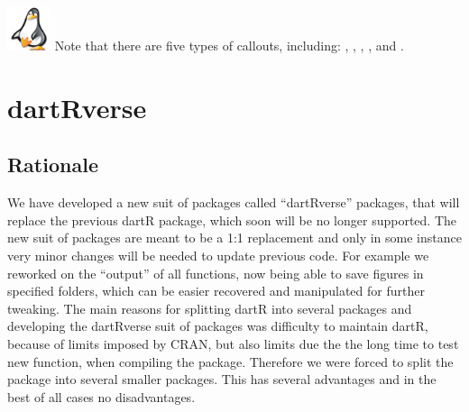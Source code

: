 \documentclass[
  letterpaper,
  DIV=11,
  numbers=noendperiod]{scrreprt}
\let\textttOrig\texttt
\renewcommand{\texttt}[1]{\textttOrig{\color{blue}{#1}}}
\begin{document}
\begin{tcolorbox}[enhanced jigsaw, coltitle=black, colframe=quarto-callout-note-color-frame, colbacktitle=quarto-callout-note-color!10!white, breakable, bottomtitle=1mm, rightrule=.15mm, opacitybacktitle=0.6, left=2mm, arc=.35mm, opacityback=0, leftrule=.75mm, toptitle=1mm, titlerule=0mm, title=\textcolor{quarto-callout-note-color}{\faInfo}\hspace{0.5em}{Exercise}, bottomrule=.15mm, toprule=.15mm, colback=white]

\includegraphics[width=0.5in,height=0.5in]{images/task.png} Note that
there are five types of callouts, including: \texttt{note},
\texttt{warning}, \texttt{important}, \texttt{tip}, and
\texttt{caution}.

\end{tcolorbox}


\hypertarget{dartrverse}{%
\chapter*{dartRverse}\label{dartrverse}}


\hypertarget{rationale}{%
\section*{Rationale}\label{rationale}}


We have developed a new suit of packages called ``dartRverse'' packages,
that will replace the previous dartR package, which soon will be no
longer supported. The new suit of packages are meant to be a 1:1
replacement and only in some instance very minor changes will be needed
to update previous code. For example we reworked on the ``output'' of
all functions, now being able to save figures in specified folders,
which can be easier recovered and manipulated for further tweaking. The
main reasons for splitting dartR into several packages and developing
the dartRverse suit of packages was difficulty to maintain dartR,
because of limits imposed by CRAN, but also limits due the the long time
to test new function, when compiling the package. Therefore we were
forced to split the package into several smaller packages. This has
several advantages and in the best of all cases no disadvantages.
\end{document}
